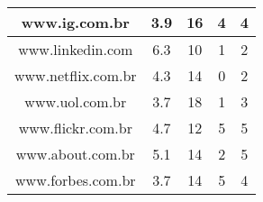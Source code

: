 \begin{center}
\begin{longtable}{|l|l|l|l|l|}
\hline
\multicolumn{1}{|c|}{www.ig.com.br} & \multicolumn{1}{c|}{3.9} & \multicolumn{1}{c|}{16} & \multicolumn{1}{c|}{4} & \multicolumn{1}{c|}{4} \\ 
\hline
\multicolumn{1}{|c|}{www.linkedin.com} & \multicolumn{1}{c|}{6.3} & \multicolumn{1}{c|}{10} & \multicolumn{1}{c|}{1} & \multicolumn{1}{c|}{2} \\ 
\hline
\multicolumn{1}{|c|}{www.netflix.com.br} & \multicolumn{1}{c|}{4.3} & \multicolumn{1}{c|}{14} & \multicolumn{1}{c|}{0} & \multicolumn{1}{c|}{2} \\ 
\hline
\multicolumn{1}{|c|}{www.uol.com.br} & \multicolumn{1}{c|}{3.7} & \multicolumn{1}{c|}{18} & \multicolumn{1}{c|}{1} & \multicolumn{1}{c|}{3} \\ 
\hline
\multicolumn{1}{|c|}{www.flickr.com.br} & \multicolumn{1}{c|}{4.7} & \multicolumn{1}{c|}{12} & \multicolumn{1}{c|}{5} & \multicolumn{1}{c|}{5} \\ 
\hline
\multicolumn{1}{|c|}{www.about.com.br} & \multicolumn{1}{c|}{5.1} & \multicolumn{1}{c|}{14} & \multicolumn{1}{c|}{2} & \multicolumn{1}{c|}{5} \\ 
\hline
\multicolumn{1}{|c|}{www.forbes.com.br} & \multicolumn{1}{c|}{3.7} & \multicolumn{1}{c|}{14} & \multicolumn{1}{c|}{5} & \multicolumn{1}{c|}{4} \\ 
\hline
\end{longtable}
\end{center}